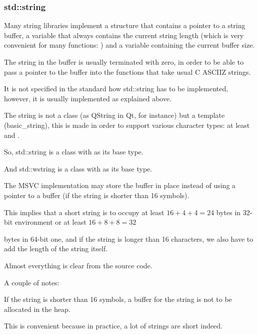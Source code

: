 \subsubsection{std::string}
\label{std_string}


Many string libraries  implement a structure that contains a pointer to a string buffer,
a variable that always contains the current string length 
(which is very convenient for many functions: ) and
a variable containing the current buffer size.

The string in the buffer is usually terminated with zero, in order to be able to pass a pointer to the buffer
into the functions that take  usual C \ac{ASCIIZ} strings.

It is not specified in the \Cpp standard how std::string has to be implemented,
however, it is usually implemented as explained above.

The \Cpp string is not a class (as QString in Qt, for instance) but a template (basic\_string),
this is made in order to support various character types: at least \Tchar and .

So, std::string is a class with \Tchar as its base type.

And std::wstring is a class with  as its base type.


The MSVC implementation may store the buffer in place instead of using a pointer to a buffer 
(if the string is shorter than 16 symbols).

This implies that a short string is to occupy at least $16 + 4 + 4 = 24$ 
bytes in 32-bit environment or at least $16 + 8 + 8 = 32$ 

bytes in 64-bit one, and if the string is longer than 16 characters, we also have to add the length of the string itself.



Almost everything is clear from the source code.

A couple of notes:

If the string is shorter than 16 symbols, 
a buffer for the string is not to be allocated in the \gls{heap}.

This is convenient because
in practice, a lot of strings are short indeed.

